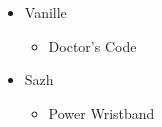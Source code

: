 \begin{menu}
\begin{multicols}{2}
\begin{itemize}
      \equip
      \begin{itemize}
        \item Vanille
              \begin{itemize}
                \item Doctor's Code
              \end{itemize}
        \item Sazh
              \begin{itemize}
                \item Power Wristband
              \end{itemize}
      \end{itemize}
    \end{itemize}
  \end{multicols}
\end{menu}

